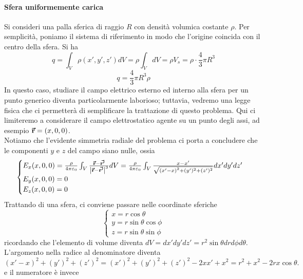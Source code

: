 \paragraph{Sfera uniformemente carica}
Si consideri una palla sferica di raggio $R$ con densità volumica costante $\rho$. Per semplicità, poniamo il sistema di riferimento in modo che l'origine coincida con il centro della sfera. Si ha
\begin{equation*}
	q=\int_{V}\rho(x',y',z')dV=\rho\int_{V}dV=\rho V_s=\rho \cdot \frac{4}{3}\pi R^3
\end{equation*}
\begin{equation}
	q=\frac{4}{3}\pi R^3\rho
\end{equation}
In questo caso, studiare il campo elettrico esterno ed interno alla sfera per un punto generico diventa particolarmente laborioso; tuttavia, vedremo una legge fisica che ci permetterà di semplificare la trattazione di questo problema. Qui ci limiteremo a considerare il campo elettrostatico agente su un punto degli assi, ad esempio $\vb*{\va{r}}=\left(x,0,0\right)$.\\
Notiamo che l'evidente simmetria radiale del problema ci porta a concludere che le componenti $y$ e $z$ del campo siano nulle, ossia
\begin{equation*}
	\begin{cases}
		E_x(x,0,0)=\frac{\rho}{4\pi\varepsilon_0}\int_V\frac{\vb*{\va{r}}-\vb*{\va{r'}}}{\abs{\vb*{\va{r}}-\vb*{\va{r'}}}^3}dV=\frac{\rho}{4\pi\varepsilon_0}\int_V\frac{x-x'}{\sqrt{\left(x'-x\right)^2+(y')^2+(z')^2}}dx'dy'dz'\\
		E_y(x,0,0)=0\\
		E_z(x,0,0)=0
	\end{cases}
\end{equation*}
Trattando di una sfera, ci conviene passare nelle coordinate sferiche
\begin{equation*}
	\begin{cases}
		x=r\cos\theta\\
		y=r\sin\theta\cos\phi\\
		z=r\sin\theta\sin\phi
	\end{cases}
\end{equation*}
ricordando che l'elemento di volume diventa $dV=dx'dy'dz'=r^2\sin\theta drd\phi d\theta$. L'argomento nella radice al denominatore diventa
\begin{equation*}
	\left(x'-x\right)^2+(y')^2+(z')^2=(x')^2+(y')^2+(z')^2-2xx'+x^2=r^2+x^2-2rx\cos\theta.
\end{equation*}
e il numeratore è invece
